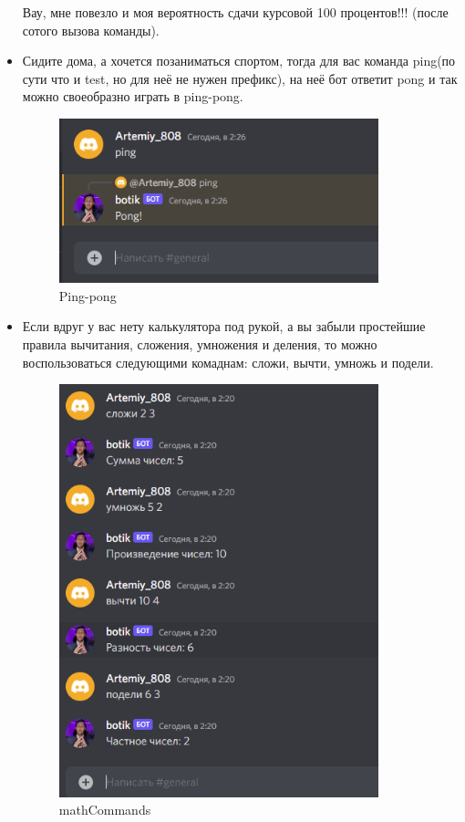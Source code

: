 \documentclass[a4paper,12pt]{article}
\begin{document}
\begin{itemize}
    Вау, мне повезло и моя вероятность сдачи курсовой 100 процентов!!! (после сотого вызова команды).
    \item Сидите дома, а хочется позаниматься спортом, тогда для вас команда ping(по сути что и test, но для неё не нужен префикс), на неё бот ответит pong и так можно своеобразно играть в ping-pong.
    \begin{figure}[h]
    \centering
    \includegraphics[width = 350px]{pictures/ping.png}
    \caption{Ping-pong}
    \label{fig:my_label16}
    \end{figure}
\newpage
    \item Если вдруг у вас нету калькулятора под рукой, а вы забыли простейшие правила вычитания, сложения, умножения и деления, то можно воспользоваться следующими комаднам: сложи, вычти, умножь и подели.
    \begin{figure}[h]
    \centering
    \includegraphics[width = 350px]{pictures/math.png}
    \caption{mathCommands}
    \label{fig:my_label17}
    \end{figure}
    

\end{itemize}
\end{document}
